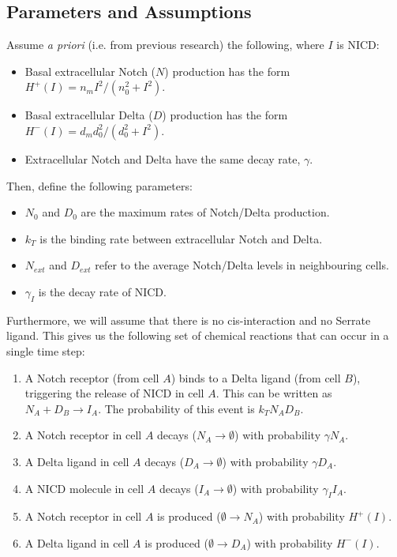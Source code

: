 \documentclass{article}
\begin{document}
\begin{flushleft}
\subsection{Parameters and Assumptions}

Assume \emph{a priori} (i.e. from previous research) the following, where $I$ is NICD:

\begin{itemize}
  \item Basal extracellular Notch ($N$) production has the form $H^{+}(I) = n_{m}I^2/(n_{0}^2 + I^2)$. 
  \item Basal extracellular Delta ($D$) production has the form $H^{-}(I) = d_{m}d_{0}^2/(d_{0}^2 + I^2)$.
  \item Extracellular Notch and Delta have the same decay rate, $\gamma$.
\end{itemize}

Then, define the following parameters:

\begin{itemize}
  \item $N_{0}$ and $D_{0}$ are the maximum rates of Notch/Delta production.
  \item $k_{T}$ is the binding rate between extracellular Notch and Delta.
  \item $N_{ext}$ and $D_{ext}$ refer to the average Notch/Delta levels in neighbouring cells.
  \item $\gamma_{I}$ is the decay rate of NICD.
\end{itemize}

Furthermore, we will assume that there is no cis-interaction and no Serrate ligand. This gives us the following set of chemical reactions that can occur in a single time step:

\begin{enumerate}
  \item A Notch receptor (from cell $A$) binds to a Delta ligand (from cell $B$), triggering the release of NICD in cell $A$. This can be written as $N_{A} + D_{B} \rightarrow I_{A}$. The probability of this event is $k_{T}N_{A}D_{B}$.
  \item A Notch receptor in cell $A$ decays ($N_{A} \rightarrow \emptyset$) with probability $\gamma N_{A}$.
  \item A Delta ligand in cell $A$ decays ($D_{A} \rightarrow \emptyset$) with probability $\gamma D_{A}$.
  \item A NICD molecule in cell $A$ decays ($I_{A} \rightarrow \emptyset$) with probability $\gamma_{I}I_{A}$.
  \item A Notch receptor in cell $A$ is produced ($\emptyset \rightarrow N_{A}$) with probability $H^{+}(I)$.
  \item A Delta ligand in cell $A$ is produced ($\emptyset \rightarrow D_{A}$) with probability $H^{-}(I)$.
\end{enumerate}


\end{flushleft}
\end{document}
